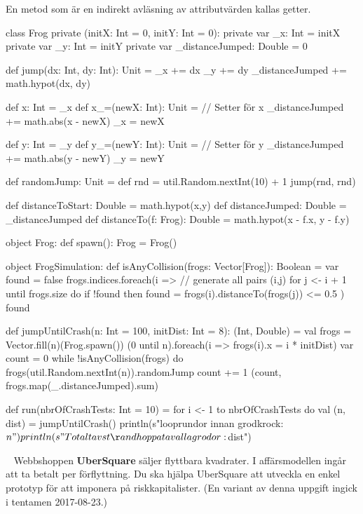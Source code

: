 \SubtaskSolved  En metod som är en indirekt avläsning av attributvärden kallas getter.

\SubtaskSolved
\begin{Code}
class Frog private (initX: Int = 0, initY: Int = 0):
  private var _x: Int = initX
  private var _y: Int = initY
  private var _distanceJumped: Double = 0

  def jump(dx: Int, dy: Int): Unit =
    _x += dx
    _y += dy
    _distanceJumped += math.hypot(dx, dy)

  def x: Int = _x
  def x_=(newX: Int): Unit = // Setter för x
    _distanceJumped += math.abs(x - newX)
    _x = newX

  def y: Int = _y
  def y_=(newY: Int): Unit = // Setter för y
    _distanceJumped += math.abs(y - newY)
    _y = newY


  def randomJump: Unit =
    def rnd = util.Random.nextInt(10) + 1
    jump(rnd, rnd)

  def distanceToStart: Double = math.hypot(x,y)
  def distanceJumped: Double = _distanceJumped
  def distanceTo(f: Frog): Double = math.hypot(x - f.x, y - f.y)

object Frog:
  def spawn(): Frog = Frog()
\end{Code}

\SubtaskSolved
\begin{Code}
object FrogSimulation:
  def isAnyCollision(frogs: Vector[Frog]): Boolean =
    var found = false
    frogs.indices.foreach(i =>  // generate all pairs (i,j)
      for j <- i + 1 until frogs.size do
        if !found then
          found = frogs(i).distanceTo(frogs(j)) <= 0.5
    )
    found

  def jumpUntilCrash(n: Int = 100, initDist: Int = 8): (Int, Double) =
    val frogs = Vector.fill(n)(Frog.spawn())
    (0 until n).foreach(i => frogs(i).x = i * initDist)
    var count = 0
    while !isAnyCollision(frogs) do
      frogs(util.Random.nextInt(n)).randomJump
      count += 1
    (count, frogs.map(_.distanceJumped).sum)


  def run(nbrOfCrashTests: Int = 10) =
    for i <- 1 to nbrOfCrashTests do
      val (n, dist) = jumpUntilCrash()
      println(s"\nAntalet looprundor innan grodkrock: $n")
      println(s"Totalt avstånd hoppat av alla grodor: $dist")
\end{Code}

\QUESTEND




\QUESTBEGIN

\Task  \what~  Webbshoppen \textbf{UberSquare} säljer flyttbara kvadrater. I affärsmodellen ingår att ta betalt per förflyttning. Du ska hjälpa UberSquare att utveckla en enkel prototyp för att imponera på riskkapitalister. (En variant av denna uppgift ingick i tentamen 2017-08-23.)

